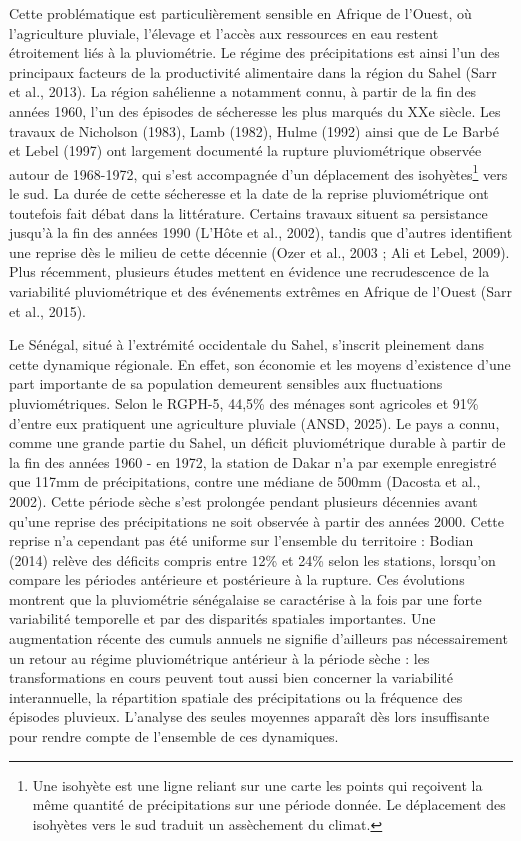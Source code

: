 \documentclass[12pt,a4paper]{report}
\begin{document}
Cette problématique est particulièrement sensible en Afrique de l'Ouest, où l'agriculture pluviale, l'élevage et l'accès aux ressources en eau restent étroitement liés à la pluviométrie. Le régime des précipitations est ainsi l'un des principaux facteurs de la productivité alimentaire dans la région du Sahel (Sarr et al., 2013). La région sahélienne a notamment connu, à partir de la fin des années 1960, l'un des épisodes de sécheresse les plus marqués du XXe siècle. Les travaux de Nicholson (1983), Lamb (1982), Hulme (1992) ainsi que de Le Barbé et Lebel (1997) ont largement documenté la rupture pluviométrique observée autour de 1968-1972, qui s'est accompagnée d'un déplacement des isohyètes\footnote{Une isohyète est une ligne reliant sur une carte les points qui reçoivent la même quantité de précipitations sur une période donnée. Le déplacement des isohyètes vers le sud traduit un assèchement du climat.} vers le sud. La durée de cette sécheresse et la date de la reprise pluviométrique ont toutefois fait débat dans la littérature. Certains travaux situent sa persistance jusqu'à la fin des années 1990 (L'Hôte et al., 2002), tandis que d'autres identifient une reprise dès le milieu de cette décennie (Ozer et al., 2003 ; Ali et Lebel, 2009). Plus récemment, plusieurs études mettent en évidence une recrudescence de la variabilité pluviométrique et des événements extrêmes en Afrique de l'Ouest (Sarr et al., 2015).

Le Sénégal, situé à l’extrémité occidentale du Sahel, s’inscrit pleinement dans cette dynamique régionale. En effet, son économie et les moyens d’existence d’une part importante de sa population demeurent sensibles aux fluctuations pluviométriques. Selon le RGPH-5, 44,5\% des ménages sont agricoles et 91\% d’entre eux pratiquent une agriculture pluviale (ANSD, 2025). Le pays a connu, comme une grande partie du Sahel, un déficit pluviométrique durable à partir de la fin des années 1960 - en 1972, la station de Dakar n'a par exemple enregistré que 117mm de précipitations, contre une médiane de 500mm (Dacosta et al., 2002). Cette période sèche s'est prolongée pendant plusieurs décennies avant qu'une reprise des précipitations ne soit observée à partir des années 2000. Cette reprise n'a cependant pas été uniforme sur l'ensemble du territoire : Bodian (2014) relève des déficits compris entre 12\% et 24\% selon les stations, lorsqu'on compare les périodes antérieure et postérieure à la rupture. Ces évolutions montrent que la pluviométrie sénégalaise se caractérise à la fois par une forte variabilité temporelle et par des disparités spatiales importantes. Une augmentation récente des cumuls annuels ne signifie d'ailleurs pas nécessairement un retour au régime pluviométrique antérieur à la période sèche : les transformations en cours peuvent tout aussi bien concerner la variabilité interannuelle, la répartition spatiale des précipitations ou la fréquence des épisodes pluvieux. L'analyse des seules moyennes apparaît dès lors insuffisante pour rendre compte de l'ensemble de ces dynamiques.
\end{document}
